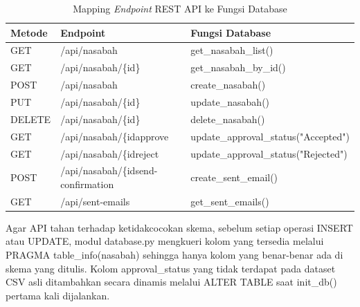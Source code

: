 \begin{table}[H]
\centering
\caption{Mapping \textit{Endpoint} REST API ke Fungsi Database}
\label{tab:crud-bab3}
\begin{tabularx}{\textwidth}{|p{1.8cm}|p{6cm}|X|}
\hline
\textbf{Metode} & \textbf{Endpoint} & \textbf{Fungsi Database} \\ \hline
GET    & /api/nasabah                          & get\_nasabah\_list() \\ \hline
GET    & /api/nasabah/\{id\}                   & get\_nasabah\_by\_id() \\ \hline
POST   & /api/nasabah                          & create\_nasabah() \\ \hline
PUT    & /api/nasabah/\{id\}                   & update\_nasabah() \\ \hline
DELETE & /api/nasabah/\{id\}                   & delete\_nasabah() \\ \hline
GET    & /api/nasabah/\{id\/approve}           & update\_approval\_status("Accepted") \\ \hline
GET    & /api/nasabah/\{id\/reject}            & update\_approval\_status("Rejected") \\ \hline
POST   & /api/nasabah/\{id\/send-confirmation} & create\_sent\_email() \\ \hline
GET    & /api/sent-emails                      & get\_sent\_emails() \\ \hline
\end{tabularx}
\end{table}

Agar API tahan terhadap ketidakcocokan skema, sebelum setiap operasi INSERT atau UPDATE, modul database.py mengkueri kolom yang tersedia melalui PRAGMA table\_info(nasabah) sehingga hanya kolom yang benar-benar ada di skema yang ditulis. Kolom approval\_status yang tidak terdapat pada dataset CSV asli ditambahkan secara dinamis melalui ALTER TABLE saat init\_db() pertama kali dijalankan.


